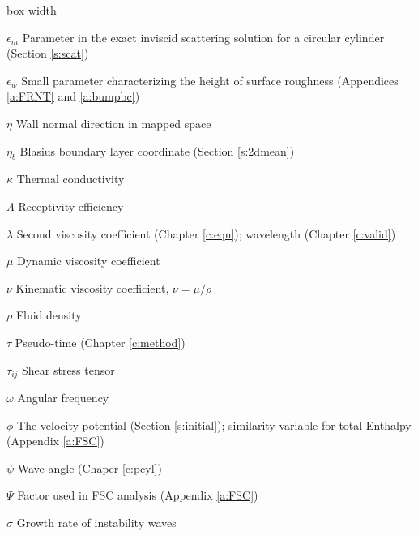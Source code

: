 \begin{descriptionlist}{box width}
\item[$\epsilon_m$]	Parameter in the exact inviscid scattering solution 
                        for a circular cylinder \break (Section \ref{s:scat})

\item[$\epsilon_w$]	Small parameter characterizing the 
                        height of surface roughness 
			(Appendices \ref{a:FRNT} and \ref{a:bumpbc})

\item[$\eta$]           Wall normal direction in mapped space

\item[$\eta_b$]         Blasius boundary layer coordinate
			(Section \ref{s:2dmean})

\item[$\kappa$]         Thermal conductivity

\item[$\Lambda$]	Receptivity efficiency

\item[$\lambda$]	Second viscosity coefficient (Chapter \ref{c:eqn}); 
                        wavelength (Chapter \ref{c:valid})

\item[$\mu$]            Dynamic viscosity coefficient

\item[$\nu$]            Kinematic viscosity coefficient, $\nu = \mu / \rho$

\item[$\rho$]           Fluid density

\item[$\tau$]		Pseudo-time (Chapter \ref{c:method})

\item[$\tau_{ij}$]      Shear stress tensor

\item[$\omega$]         Angular frequency

\item[$\phi$]		The velocity potential (Section \ref{s:initial});
                        similarity variable for total Enthalpy \break
                        (Appendix \ref{a:FSC})

\item[$\psi$]		Wave angle (Chaper \ref{c:pcyl})

\item[$\Psi$]		Factor used in FSC analysis (Appendix \ref{a:FSC})

\item[$\sigma$]		Growth rate of instability waves


\end{descriptionlist}
